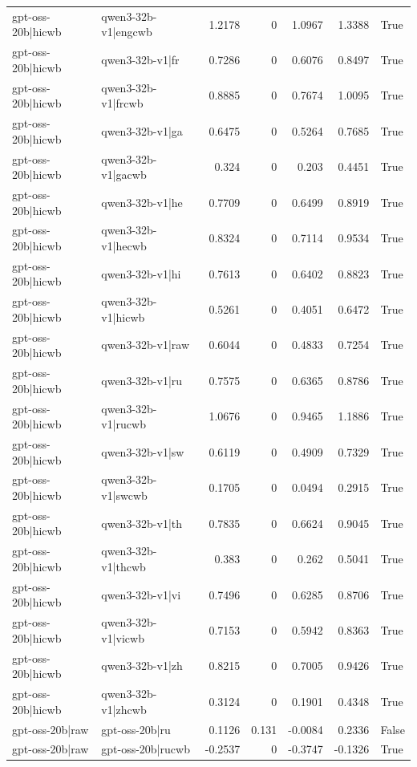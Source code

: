 \begin{table}
\begin{tabular}{l l r r r r l}
gpt-oss-20b|hicwb & qwen3-32b-v1|engcwb & 1.2178 & 0 & 1.0967 & 1.3388 & True \\
gpt-oss-20b|hicwb & qwen3-32b-v1|fr & 0.7286 & 0 & 0.6076 & 0.8497 & True \\
gpt-oss-20b|hicwb & qwen3-32b-v1|frcwb & 0.8885 & 0 & 0.7674 & 1.0095 & True \\
gpt-oss-20b|hicwb & qwen3-32b-v1|ga & 0.6475 & 0 & 0.5264 & 0.7685 & True \\
gpt-oss-20b|hicwb & qwen3-32b-v1|gacwb & 0.324 & 0 & 0.203 & 0.4451 & True \\
gpt-oss-20b|hicwb & qwen3-32b-v1|he & 0.7709 & 0 & 0.6499 & 0.8919 & True \\
gpt-oss-20b|hicwb & qwen3-32b-v1|hecwb & 0.8324 & 0 & 0.7114 & 0.9534 & True \\
gpt-oss-20b|hicwb & qwen3-32b-v1|hi & 0.7613 & 0 & 0.6402 & 0.8823 & True \\
gpt-oss-20b|hicwb & qwen3-32b-v1|hicwb & 0.5261 & 0 & 0.4051 & 0.6472 & True \\
gpt-oss-20b|hicwb & qwen3-32b-v1|raw & 0.6044 & 0 & 0.4833 & 0.7254 & True \\
gpt-oss-20b|hicwb & qwen3-32b-v1|ru & 0.7575 & 0 & 0.6365 & 0.8786 & True \\
gpt-oss-20b|hicwb & qwen3-32b-v1|rucwb & 1.0676 & 0 & 0.9465 & 1.1886 & True \\
gpt-oss-20b|hicwb & qwen3-32b-v1|sw & 0.6119 & 0 & 0.4909 & 0.7329 & True \\
gpt-oss-20b|hicwb & qwen3-32b-v1|swcwb & 0.1705 & 0 & 0.0494 & 0.2915 & True \\
gpt-oss-20b|hicwb & qwen3-32b-v1|th & 0.7835 & 0 & 0.6624 & 0.9045 & True \\
gpt-oss-20b|hicwb & qwen3-32b-v1|thcwb & 0.383 & 0 & 0.262 & 0.5041 & True \\
gpt-oss-20b|hicwb & qwen3-32b-v1|vi & 0.7496 & 0 & 0.6285 & 0.8706 & True \\
gpt-oss-20b|hicwb & qwen3-32b-v1|vicwb & 0.7153 & 0 & 0.5942 & 0.8363 & True \\
gpt-oss-20b|hicwb & qwen3-32b-v1|zh & 0.8215 & 0 & 0.7005 & 0.9426 & True \\
gpt-oss-20b|hicwb & qwen3-32b-v1|zhcwb & 0.3124 & 0 & 0.1901 & 0.4348 & True \\
gpt-oss-20b|raw & gpt-oss-20b|ru & 0.1126 & 0.131 & -0.0084 & 0.2336 & False \\
gpt-oss-20b|raw & gpt-oss-20b|rucwb & -0.2537 & 0 & -0.3747 & -0.1326 & True \\

\end{tabular}
\end{table}
